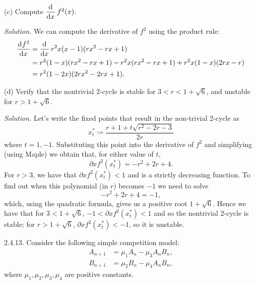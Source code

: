 \documentclass{article}
\newcommand{\xs}{x^*}
\begin{document}
\vspace{5mm}

(c) Compute $\dod{}{x} f^2(x)$.

\textit{Solution.}
We can compute the derivative of $f^2$ using the product rule:
%
\begin{align*}
    \dod{f^2}{x}
        &= \dod{}{x} r^2 x (x - 1) (r x^2 - r x + 1) \\
        &= r^2 (1 - x) (r x^2 - r x + 1)
           - r^2 x (r x^2 - r x + 1)
           + r^2 x (1 - x) (2 r x - r) \\
        &=  r^2 (1 - 2 x) (2 r x^2 - 2 r x + 1)
        .
\end{align*}

\vspace{5mm}

(d) Verify that the nontrivial $2$-cycle is stable for $3 < r < 1 +
\sqrt{6}$, and unstable for $r > 1 + \sqrt{6}$.

\textit{Solution.}
Let's write the fixed points that result in the non-trivial 2-cycle as
%
\begin{equation*}
    \xs_t \coloneqq \frac{r + 1 + t \sqrt{r^2 - 2 r - 3}}{2 r}
\end{equation*}
%
where $t = 1, -1$. Substituting this point into the derivative of $f^2$
and simplifying (using Maple) we obtain that, for either value of $t$,
%
\begin{equation*}
    \partial x f^2(\xs_t) = -r^2 + 2 r + 4
    .
\end{equation*}
%
For $r > 3$, we have that $\partial x f^2(\xs_t) < 1$ and is a strictly
decreasing function. To find out when this polynomial (in $r$) becomes
$-1$ we need to solve
%
\begin{equation*}
    -r^2 + 2 r + 4 = - 1
    ,
\end{equation*}
%
which, using the quadratic formula, gives us a positive root $1 + \sqrt{6}$.
Hence we have that for $3 < 1 + \sqrt{6}$, $-1< \partial x f^2(\xs_t) < 1$
and so the nontrivial 2-cycle is stable; for $r > 1 + \sqrt{6}$,
$\partial x f^2(\xs_t) < - 1$, so it is unstable.


\newpage

2.4.13. Consider the following simple competition model:
%
\begin{align*}
    A_{n + 1} &= \mu_1 A_n - \mu_3 A_n B_n, \\
    B_{n + 1} &= \mu_2 B_n - \mu_4 A_n B_n,
\end{align*}
%
where $\mu_1, \mu_2, \mu_3, \mu_4$ are positive constants.
\end{document}
